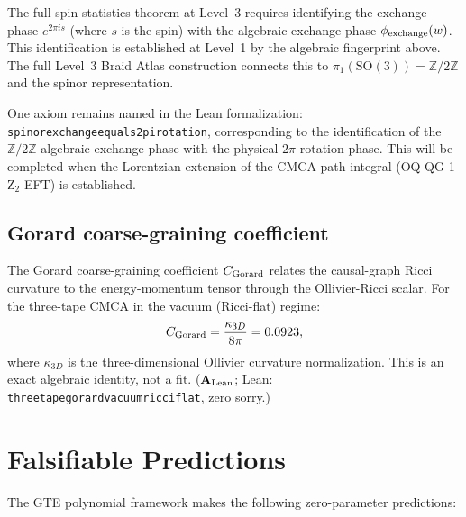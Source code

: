 \documentclass[11pt]{article}
\theoremstyle{remark}
\newcommand{\ZZ}{\mathbb{Z}}
\newcommand{\lean}[1]{%
  \penalty-100
  \begingroup\def\_{\textunderscore\allowbreak}\texttt{#1}\endgroup}
\newcommand{\CatAL}{\ensuremath{\textbf{A}_{\rm Lean}}}
\begin{document}
The full spin-statistics theorem at Level~3 requires identifying the exchange
phase $e^{2\pi i s}$ (where $s$ is the spin) with the algebraic exchange phase
$\phi_{\rm exchange}(w)$. This identification is established at Level~1 by the
algebraic fingerprint above. The full Level~3 Braid Atlas construction connects
this to $\pi_1(\mathrm{SO}(3)) = \mathbb{Z}/2\mathbb{Z}$ and the spinor
representation.

One axiom remains named in the Lean formalization:
\lean{spinor\_exchange\_equals\_2pi\_rotation}, corresponding to the identification
of the $\ZZ/2\ZZ$ algebraic exchange phase with the physical $2\pi$ rotation
phase. This will be completed when the Lorentzian extension of the CMCA path
integral (OQ-QG-1-Z$_2$-EFT) is established.

\subsection{Gorard coarse-graining coefficient}
\label{ssec:gorard}

The Gorard coarse-graining coefficient $C_{\rm Gorard}$ relates the causal-graph
Ricci curvature to the energy-momentum tensor through the Ollivier-Ricci scalar.
For the three-tape CMCA in the vacuum (Ricci-flat) regime:
\[
  C_{\rm Gorard} = \frac{\kappa_{3D}}{8\pi} = 0.0923,
\]
where $\kappa_{3D}$ is the three-dimensional Ollivier curvature normalization.
This is an exact algebraic identity, not a fit.
($\CatAL$; Lean: \lean{three\_tape\_gorard\_vacuum\_ricci\_flat}, zero sorry.)

\section{Falsifiable Predictions}
\label{sec:predictions}

The GTE polynomial framework makes the following zero-parameter predictions:
\end{document}
